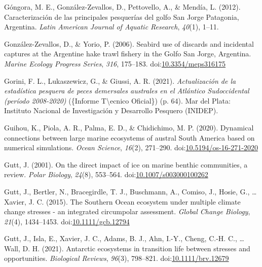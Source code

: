 \documentclass[
]{article}
\newlength{\cslhangindent}
\newenvironment{CSLReferences}[2] %
 {\begin{list}{}{%
  \setlength{\itemindent}{0pt}
  \setlength{\leftmargin}{0pt}
  \setlength{\parsep}{0pt}
  \ifodd #1
   \setlength{\leftmargin}{\cslhangindent}
   \setlength{\itemindent}{-1\cslhangindent}
  \fi
  \setlength{\itemsep}{#2\baselineskip}}}
 {\end{list}}
\begin{document}
\begin{CSLReferences}{1}{0}
Góngora, M. E., González-Zevallos, D., Pettovello, A., \& Mendía, L.
(2012). Caracterización de las principales pesquerías del golfo {San
Jorge Patagonia}, {Argentina}. \emph{Latin American Journal of Aquatic
Research}, \emph{40}(1), 1--11.

González-Zevallos, D., \& Yorio, P. (2006). Seabird use of discards and
incidental captures at the {Argentine} hake trawl fishery in the {Golfo
San Jorge}, {Argentina}. \emph{Marine Ecology Progress Series},
\emph{316}, 175--183.
doi:\href{https://doi.org/10.3354/meps316175}{10.3354/meps316175}

Gorini, F. L., Lukaszewicz, G., \& Giussi, A. R. (2021).
\emph{{Actualización de la estadística pesquera de peces demersales
australes en el Atlántico Sudoccidental (período 2008-2020)}} (\{Informe
T\textbackslash\textquotesingle ecnico Oficial\}) (p. 64). {Mar del
Plata}: {Instituto Nacional de Investigación y Desarrollo Pesquero
(INIDEP)}.

Guihou, K., Piola, A. R., Palma, E. D., \& Chidichimo, M. P. (2020).
Dynamical connections between large marine ecosystems of austral {South
America} based on numerical simulations. \emph{Ocean Science},
\emph{16}(2), 271--290.
doi:\href{https://doi.org/10.5194/os-16-271-2020}{10.5194/os-16-271-2020}

Gutt, J. (2001). On the direct impact of ice on marine benthic
communities, a review. \emph{Polar Biology}, \emph{24}(8), 553--564.
doi:\href{https://doi.org/10.1007/s003000100262}{10.1007/s003000100262}

Gutt, J., Bertler, N., Bracegirdle, T. J., Buschmann, A., Comiso, J.,
Hosie, G., \ldots{} Xavier, J. C. (2015). The {Southern Ocean} ecosystem
under multiple climate change stresses - an integrated circumpolar
assessment. \emph{Global Change Biology}, \emph{21}(4), 1434--1453.
doi:\href{https://doi.org/10.1111/gcb.12794}{10.1111/gcb.12794}

Gutt, J., Isla, E., Xavier, J. C., Adams, B. J., Ahn, I.-Y., Cheng,
C.-H. C., \ldots{} Wall, D. H. (2021). Antarctic ecosystems in
transition \textendash{} life between stresses and opportunities.
\emph{Biological Reviews}, \emph{96}(3), 798--821.
doi:\href{https://doi.org/10.1111/brv.12679}{10.1111/brv.12679}


\end{CSLReferences}
\end{document}
